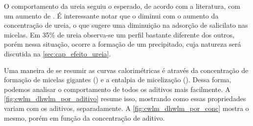 			O comportamento da ureia seguiu o esperado, de acordo com a literatura, com um aumento de \cwlm{}. É interessante notar que o \DHwlm{} diminui com o aumento da concentração de ureia, o que sugere uma diminuição na adsorção de salicilato nas micelas. Em 35\% de ureia observa-se um perfil bastante diferente dos outros, porém nessa situação, ocorre a formação de um precipitado, cuja natureza será discutida na \autoref{sec:cap_efeito_ureia}.
			
			Uma maneira de se resumir as curvas calorimétricas é através da concentração de formação de micelas gigantes (\cwlm) e a entalpia de micelização (\DHwlm). Dessa forma, podemos analisar o comportamento de todos os aditivos mais facilmente. A \autoref{fig:cwlm_dhwlm_por_aditivo} resume isso, mostrando como essas propriedades variam com os aditivos, separadamente. A \autoref{fig:cwlm_dhwlm_por_conc} mostra o mesmo, porém em função da concentração de aditivo.
			
